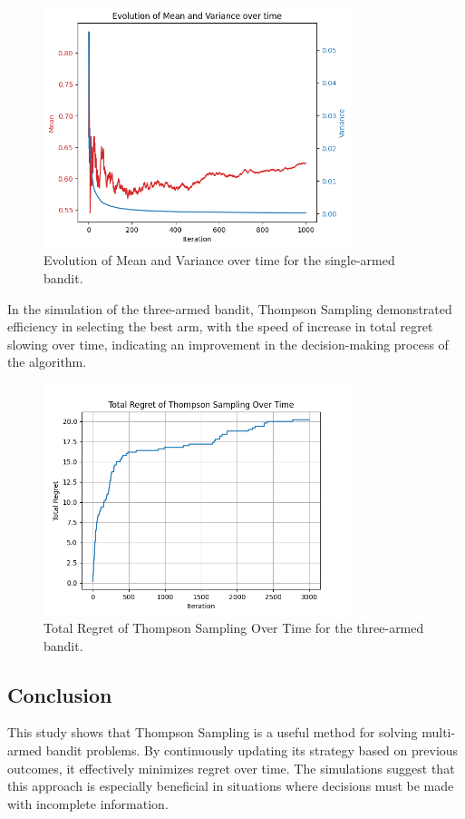 \documentclass[12pt]{article}
\begin{document}
\begin{figure}[ht]
\centering
\includegraphics[width=0.8\textwidth]{image/2_OneArmedBandit.png}
\caption{Evolution of Mean and Variance over time for the single-armed bandit.}
\end{figure}

In the simulation of the three-armed bandit, Thompson Sampling demonstrated efficiency in selecting the best arm, with the speed of increase in total regret slowing over time, indicating an improvement in the decision-making process of the algorithm.

\begin{figure}[ht]
\centering
\includegraphics[width=0.8\textwidth]{image/2_ThreeArmedBandits.png}
\caption{Total Regret of Thompson Sampling Over Time for the three-armed bandit.}
\end{figure}

\subsection{Conclusion}
This study shows that Thompson Sampling is a useful method for solving multi-armed bandit problems. By continuously updating its strategy based on previous outcomes, it effectively minimizes regret over time. The simulations suggest that this approach is especially beneficial in situations where decisions must be made with incomplete information. 
\end{document}
